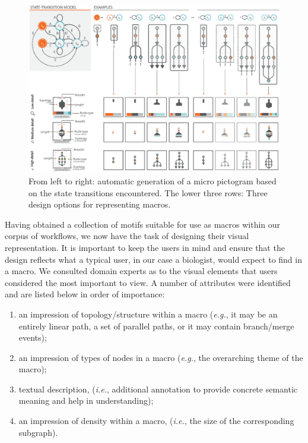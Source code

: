 \begin{figure}[t!]
\centering
\includegraphics[scale=.75]{images/automacron/macro-design-options.eps}
\caption{From left to right: automatic generation of a micro pictogram based on the state transitions encountered.
The lower three rows: Three design options for representing macros.}
\label{fig:design-options}
\vspace{-3mm}
\end{figure}

Having obtained a collection of motifs suitable for use as macros within our corpus of workflows, we now have the task of designing their visual representation.
It is important to keep the users in mind and ensure that the design reflects what a typical user, in our case a biologist, would expect to find in a macro. 
We consulted domain experts as to the visual elements that users considered the most important to view.
A number of attributes were identified and are listed below in order of importance:

\vspace{-2mm}
\begin{enumerate}[itemsep=-1mm]
\item an impression of topology/structure within a macro (\emph{e.g.}, it may be an entirely linear path, a set of parallel paths, or it may contain branch/merge events);
\item an impression of types of nodes in a macro (\emph{e.g.}, the overarching theme of the macro);
\item textual description, (\emph{i.e.}, additional annotation to provide concrete semantic meaning and help in understanding);
\item an impression of density within a macro, (\emph{i.e.}, the size of the corresponding subgraph).
\end{enumerate} 

